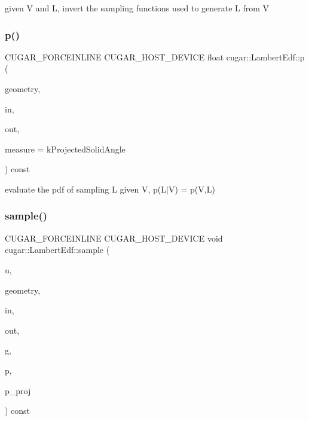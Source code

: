 given V and L, invert the sampling functions used to generate L from V \mbox{\label{structcugar_1_1_lambert_edf_a388560f22fa74fe55678388ea0ae7f69}} 
\subsubsection{\texorpdfstring{p()}{p()}}
{\footnotesize\ttfamily C\+U\+G\+A\+R\+\_\+\+F\+O\+R\+C\+E\+I\+N\+L\+I\+NE C\+U\+G\+A\+R\+\_\+\+H\+O\+S\+T\+\_\+\+D\+E\+V\+I\+CE float cugar\+::\+Lambert\+Edf\+::p (\begin{DoxyParamCaption}\item[{const \hyperlink{structcugar_1_1_differential_geometry}{Differential\+Geometry} \&}]{geometry,  }\item[{const \hyperlink{structcugar_1_1_vector}{Vector3f}}]{in,  }\item[{const \hyperlink{structcugar_1_1_vector}{Vector3f}}]{out,  }\item[{const Spherical\+Measure}]{measure = {\ttfamily kProjectedSolidAngle} }\end{DoxyParamCaption}) const\hspace{0.3cm}{\ttfamily [inline]}}

evaluate the pdf of sampling L given V, p(L$\vert$V) = p(\+V,\+L) \mbox{\label{structcugar_1_1_lambert_edf_ae860824e138c2d39c17e2d8d7bac5557}} 
\subsubsection{\texorpdfstring{sample()}{sample()}}
{\footnotesize\ttfamily C\+U\+G\+A\+R\+\_\+\+F\+O\+R\+C\+E\+I\+N\+L\+I\+NE C\+U\+G\+A\+R\+\_\+\+H\+O\+S\+T\+\_\+\+D\+E\+V\+I\+CE void cugar\+::\+Lambert\+Edf\+::sample (\begin{DoxyParamCaption}\item[{const \hyperlink{structcugar_1_1_vector}{Vector2f}}]{u,  }\item[{const \hyperlink{structcugar_1_1_differential_geometry}{Differential\+Geometry} \&}]{geometry,  }\item[{const \hyperlink{structcugar_1_1_vector}{Vector3f}}]{in,  }\item[{\hyperlink{structcugar_1_1_vector}{Vector3f} \&}]{out,  }\item[{\hyperlink{structcugar_1_1_vector}{Vector3f} \&}]{g,  }\item[{float \&}]{p,  }\item[{float \&}]{p\+\_\+proj }\end{DoxyParamCaption}) const\hspace{0.3cm}{\ttfamily [inline]}}

